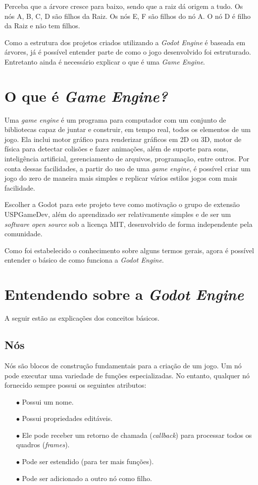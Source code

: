 Perceba que a árvore cresce para baixo, sendo que a raiz dá origem a tudo.
Os nós A, B, C, D são filhos da Raiz. Os nós E, F são filhos do nó A. O nó
D é filho da Raiz e não tem filhos.

Como a estrutura dos projetos criados utilizando a \textit{Godot Engine} é 
baseada em árvores, já é possível entender parte de como o jogo desenvolvido foi 
estruturado. Entretanto ainda é necessário explicar o que é uma 
\textit{Game Engine}.


\section{O que é \textit{Game Engine?}}

Uma \textit{game engine} é um programa para computador com um conjunto de 
bibliotecas capaz de juntar e construir, em tempo real, todos os elementos de um
jogo.
Ela inclui motor gráfico para renderizar gráficos em 2D ou 3D, motor de física 
para detectar colisões e fazer animações, além de suporte para sons, 
inteligência artificial, gerenciamento de arquivos, programação, entre outros.
Por conta dessas facilidades, a partir do uso de uma \textit{game engine}, é 
possível criar um jogo do zero de maneira mais simples e replicar vários estilos
jogos com mais facilidade.

Escolher a Godot para este projeto teve como motivação o grupo de extensão 
USPGameDev, além do aprendizado ser relativamente simples e de ser um 
\textit{software open source} sob a licença MIT, desenvolvido de forma 
independente pela comunidade.

Como foi estabelecido o conhecimento sobre alguns termos gerais, agora é
possível entender o básico de como funciona a \textit{Godot Engine}.

\section{Entendendo sobre a \textit{Godot Engine}}

A seguir estão as explicações dos conceitos básicos.

\subsection{Nós}

Nós são blocos de construção fundamentais para a criação de um jogo. Um nó pode
executar uma variedade de funções especializadas.
No entanto, qualquer nó fornecido sempre possui os seguintes atributos:
\begin{itemize}
    \item[$\bullet$]
        Possui um nome.
    \item[$\bullet$]
        Possui propriedades editáveis.
    \item[$\bullet$]
        Ele pode receber um retorno de chamada (\textit{callback}) para 
        processar todos os quadros (\textit{frames}).
    \item[$\bullet$]
        Pode ser estendido (para ter mais funções).
    \item[$\bullet$]
        Pode ser adicionado a outro nó como filho.
\end{itemize}

